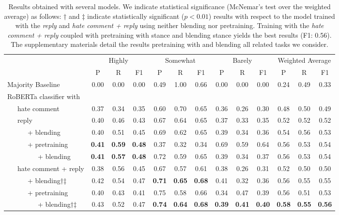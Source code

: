 \documentclass[11pt]{article}
\begin{document}
\begin{table*}[ht!]
	\setlength{\tabcolsep}{.0775in}
	\small
	\centering	
	\begin{tabular}{l ccc ccc ccc ccc}
		\toprule
		\multicolumn{1}{c}{} & \multicolumn{3}{c}{Highly} & \multicolumn{3}{c}{Somewhat} & \multicolumn{3}{c}{Barely} & \multicolumn{3}{c}{Weighted Average} \\
		\cmidrule(lr){2-4} \cmidrule(lr){5-7} \cmidrule(lr){8-10} \cmidrule(lr){11-13} 
		& P & R & F1 & P & R & F1 & P & R & F1 & P & R & F1 \\
		\hline
		\addlinespace[1pt]
		Majority Baseline & 0.00 & 0.00 & 0.00 & 0.49 & 1.00 & 0.66 & 0.00 & 0.00 & 0.00 &  0.24 & 0.49 & 0.33 \\ \addlinespace
		
		RoBERTa classifier with \\ 
		~~~hate comment & 0.37 & 0.34 & 0.35 & 0.60 & 0.70 & 0.65 & 0.36 & 0.26 & 0.30 & 0.48 & 0.50 & 0.49 \\ \addlinespace
		
		~~~reply & 0.40 & 0.46 & 0.43 &  0.67 & 0.64 & 0.65 & 0.37 & 0.33 & 0.35 & 0.52 & 0.52 & 0.52 \\		
		~~~~~~+ blending & 0.40 & 0.51 & 0.45 & 0.69 & 0.62 & 0.65 & 0.39 & 0.34 & 0.36 & 0.54 & 0.56 & 0.53\\
		~~~~~~+ pretraining &\textbf{ 0.41 }& \textbf{0.59} & \textbf{0.48} & 0.37 & 0.32 & 0.34 & 0.69 & 0.59 & 0.64 & 0.56 & 0.53 & 0.54\\ 
		~~~~~~~~~+ blending &\textbf{0.41} &	\textbf{0.57} & \textbf{0.48} & 0.72 & 0.59 &	0.65 & 0.39 & 0.34 & 0.37 &	0.56 & 0.53 &	0.54\\ 
		\addlinespace
		
		~~~hate comment + reply & 0.38 & 0.56 & 0.45 & 0.67 & 0.57 & 0.61 & 0.38 & 0.26 & 0.31 & 0.52 & 0.50 & 0.50\\
		~~~~~~+ blending†‡ & 0.42 & 0.54 & 0.47 & \textbf{0.71} & \textbf{0.65} & \textbf{0.68} & 0.41 & 0.32 & 0.36 & 0.56 & 0.55 & 0.55 \\
		~~~~~~+ pretraining & 0.40 & 0.43 & 0.41 & 0.75 & 0.58 & 0.66 & 0.34 & 0.47 & 0.39 & 0.56 & 0.51 & 0.53\\
		~~~~~~~~~+ blending†‡ & 0.43 & 0.52 & 0.47 & \textbf{0.74} & \textbf{0.64} & \textbf{0.68} & \textbf{0.39} & \textbf{0.41} & \textbf{0.40} & \textbf{0.58} & \textbf{0.55 }& \textbf{0.56}\\
		\bottomrule
		
	\end{tabular}
	\caption{Results obtained with several models. 
		We indicate statistical significance (McNemar’s test \cite{mcnemar1947note} over the weighted average) as follows: 
		† and ‡ indicate statistically significant ($p<0.01$) results with respect to the model trained with the \emph{reply} and \emph{hate comment + reply} using neither blending nor pretraining.
		Training with the \emph{hate comment + reply}
		coupled with pretraining with stance and blending stance yields the best results (F1: 0.56).
		The supplementary materials detail the results pretraining with and blending all related tasks we consider.}
	\label{t:model-results}
\end{table*}
\end{document}

